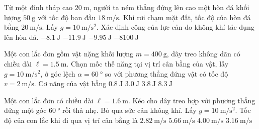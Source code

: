 \begin{ex}
Từ một đỉnh tháp cao $\SI{20}{\meter}$, người ta ném thẳng đứng lên cao một hòn đá khối lượng $\SI{50}{\gram}$ với tốc độ ban đầu $\SI{18}{\meter/\second}$. Khi rơi chạm mặt đất, tốc độ của hòn đá bằng $\SI{20}{\meter/\second}$. Lấy $g=\SI{10}{\meter/\second^2}$. Xác định công của lực cản do không khí tác dụng lên hòn đá.	
	\choice
	{\True $\SI{-8.1}{\joule}$}
	{$\SI{-11.9}{\joule}$}
	{$\SI{-9.95}{\joule}$}
	{$\SI{-8100}{\joule}$}
\end{ex}
\begin{ex}
Một con lắc đơn gồm vật nặng khối lượng $m = \SI{400}{\gram}$, dây treo không dãn có chiều dài $\ell=\SI{1.5}{\meter}$. Chọn mốc thế năng tại vị trí cân bằng của vật, lấy $g=\SI{10}{\meter/\second^2}$, ở góc lệch $\alpha=\SI{60}{\degree}$ so với phương thẳng đứng vật có tốc độ $v=\SI{2}{\meter/\second}$. Cơ năng của vật bằng	
	\choice
	{$\SI{0.8}{\joule}$}
	{$\SI{3.0}{\joule}$}
	{\True $\SI{3.8}{\joule}$}
	{$\SI{8.3}{\joule}$}
\end{ex}
\begin{ex}
Một con lắc đơn có chiều dài $\ell=\SI{1.6}{\meter}$. Kéo cho dây treo hợp với phương thẳng đứng một góc $\SI{60}{\degree}$ rồi thả nhẹ. Bỏ qua sức cản không khí. Lấy $g = \SI{10}{\meter/\second^2}$. Tốc độ của con lắc khi đi qua vị trí cân bằng là	
	\choice
	{$\SI{2.82}{\meter/\second}$}
	{$\SI{5.66}{\meter/\second}$}
	{\True $\SI{4.00}{\meter/\second}$}
	{$\SI{3.16}{\meter/\second}$}
\end{ex}


